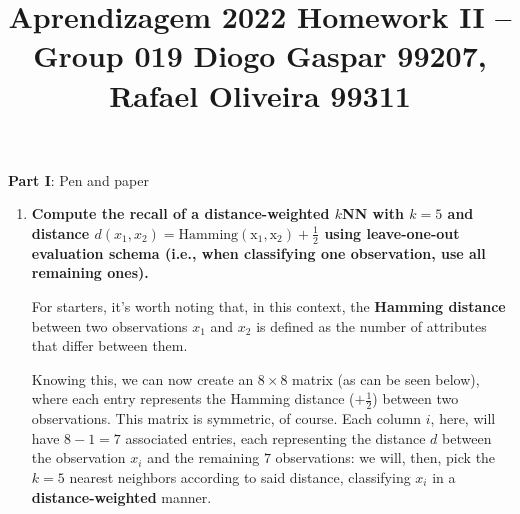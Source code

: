 \documentclass[12pt]{article}
\title{\large{Aprendizagem 2022}\vskip 0.2cm Homework II -- Group 019\vskip 0.2cm Diogo Gaspar 99207, Rafael Oliveira 99311}
\date{}
\begin{document}
\maketitle
\center\large{\vskip -2.5cm\textbf{Part I}: Pen and paper}
\begin{enumerate}[leftmargin=\labelsep]

  \item \textbf{Compute the recall of a distance-weighted $k$NN with $k=5$ and distance
  $d(x_1, x_2) = \operatorname{Hamming(x_1, x_2)} + \frac{1}{2}$ using leave-one-out
  evaluation schema (i.e., when classifying one observation, use all remaining ones).}

  For starters, it's worth noting that, in this context, the \textbf{Hamming distance} between two
  observations $x_1$ and $x_2$ is defined as the number of attributes that differ between them.

  Knowing this, we can now create an $8 \times 8$ matrix (as can be seen below), where each entry
  represents the Hamming distance ($+ \frac{1}{2}$) between two observations. This matrix is symmetric, of course.
  Each column $i$, here, will have $8 - 1 = 7$ associated entries, each representing the distance $d$
  between the observation $x_i$ and the remaining $7$ observations: we will, then,
  pick the $k = 5$ nearest neighbors according to said distance, classifying $x_i$
  in a \textbf{distance-weighted} manner.


\end{enumerate}
\end{document}
